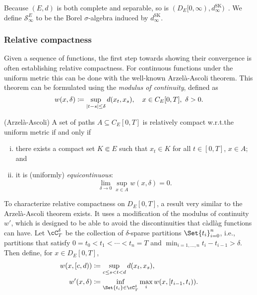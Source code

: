 Because \((E, d)\) is both complete and separable, so is \((D_E[0,\infty), d_\infty^\mathrm{SK})\)~\cite[Theorem 3.5.6]{ethierMarkovProcessesCharacterization1986}.
We define \(\mathscr{S}_\infty^E\) to be the Borel \( \sigma \)-algebra induced by \( d_\infty^\mathrm{SK} \).


\subsubsection{Relative compactness}

Given a sequence of functions, the first step towards showing their convergence is often establishing relative compactness.
For continuous functions under the uniform metric this can be done with the well-known Arzelà-Ascoli theorem.
This theorem can be formulated using the \textit{modulus of continuity}, defined as
\begin{equation}
  w(x, \delta) \coloneqq \sup_{\lvert t - s\rvert \leq \delta} d(x_t, x_s), \quad x \in C_E[0,T],\ \delta > 0.
\end{equation}

\begin{theorem}(Arzelà-Ascoli)
  A set of paths \( A \subseteq C_E[0,T] \) is relatively compact w.r.t.\@ the uniform metric if and only if
  \begin{enumerate}[(i)]
    \item there exists a compact set \(K \Subset E\) such that \(x_t \in K\) for all \(t \in [0,T]\), \(x \in A\); and
    \item it is (uniformly) \textit{equicontinuous}:
    \begin{equation}
      \lim_{\delta\to0} \sup_{x \in A} w(x,\delta) = 0.
    \end{equation}
  \end{enumerate}
\end{theorem}

To characterize relative compactness on \( D_E[0,T] \), a result very similar to the Arzelà-Ascoli theorem exists.
It uses a modification of the modulus of continuity \( w' \), which is designed to be able to avoid the discontinuities that càdlàg functions can have.
Let \( \cC_T^\delta \) be the collection of \( \delta \)-sparse partitions \(\Set{t_i}_{i=0}^n\), i.e., partitions that satisfy \(0 = t_0 < t_1 < \cdots < t_n = T\) and \( \min_{i=1,\dots,n} t_i - t_{i-1} > \delta \).
Then define, for \( x \in D_E[0,T] \),
\begin{equation}\label{eq:w-w'-def}
  \begin{split}
    w(x, [c,d))      & \coloneqq \sup_{c \leq s < t < d} d(x_t,x_s),                            \\
    w'(x, \delta) & \coloneqq \inf_{\Set{t_i} \in \cC_T^\delta} \max_i w(x, [t_{i-1}, t_i)).
  \end{split}
\end{equation}

